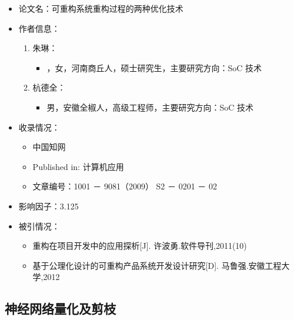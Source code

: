 \begin{itemize}
    \item 论文名：可重构系统重构过程的两种优化技术
    \item 作者信息：
        \begin{enumerate}
            \item 朱琳：
                \begin{itemize}
                    \item ，女，河南商丘人，硕士研究生，主要研究方向：SoC 技术 
                \end{itemize}
            \item 杭德全：
                \begin{itemize}
                    \item 男，安徽全椒人，高级工程师，主要研究方向：SoC 技术
                \end{itemize}
        \end{enumerate}

    \item 收录情况：
        \begin{itemize}
            \item 中国知网
            \item Published in: 计算机应用
            \item 文章编号：1001 － 9081（2009） S2 － 0201 － 02
        \end{itemize}

    \item 影响因子：3.125
    \item 被引情况：
        \begin{itemize}
            \item  重构在项目开发中的应用探析[J]. 许波勇.软件导刊,2011(10)
            \item  基于公理化设计的可重构产品系统开发设计研究[D]. 马鲁强.安徽工程大学,2012
        \end{itemize}
\end{itemize}


\subsection{神经网络量化及剪枝}

